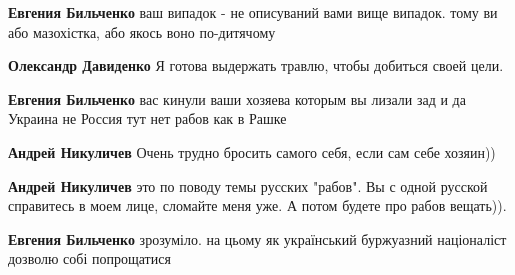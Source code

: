 \begin{itemize}
\begin{itemize}
\textbf{Евгения Бильченко} ваш випадок - не описуваний вами вище випадок. тому ви або мазохістка, або якось воно по-дитячому

 
\textbf{Олександр Давиденко} Я готова выдержать травлю, чтобы добиться своей цели.

 
\textbf{Евгения Бильченко} вас кинули ваши хозяева которым вы лизали зад и да Украина не Россия тут нет рабов как в Рашке

 
\textbf{Андрей Никуличев} Очень трудно бросить самого себя, если сам себе хозяин))

 
\textbf{Андрей Никуличев} это по поводу темы русских "рабов". Вы с одной русской справитесь в моем лице, сломайте меня уже. А потом будете про рабов вещать)).

 
\textbf{Евгения Бильченко} зрозуміло. на цьому як український буржуазний націоналіст дозволю собі попрощатися

 

\end{itemize}
\end{itemize}

